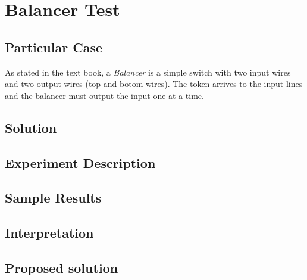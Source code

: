 \section{\textbf{Balancer Test}}
\subsection{Particular Case}
\par
As stated in the text book, a \textit{Balancer} is a simple switch with two input wires
and two output wires (top and botom wires). The token arrives to the input lines and the
balancer must output the input one at a time.
\par
\subsection{Solution}
\par
\par
\subsection{Experiment Description}
\par
\par
\subsection{Sample Results}
\par
\par
\subsection{Interpretation}
\par
\par
\subsection{Proposed solution}
\par
\par
